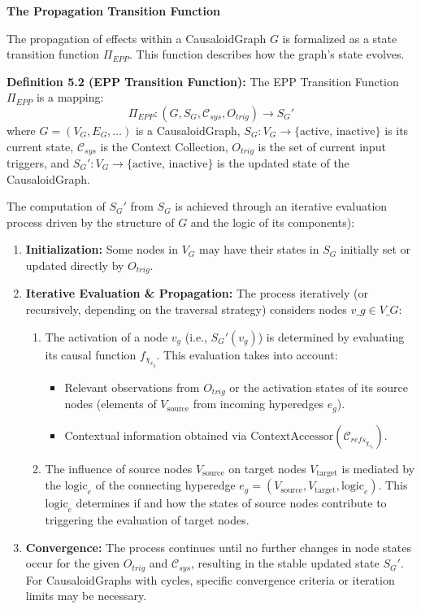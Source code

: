     
\textbf{The Propagation Transition Function}
    
    The propagation of effects within a CausaloidGraph \(G\) is formalized as a state transition function \(\Pi_{EPP}\). This function describes how the graph's state evolves.

    \textbf{Definition 5.2 (EPP Transition Function):} The EPP Transition Function \(\Pi_{EPP}\) is a mapping:
    \[ \Pi_{EPP} : (G, S_G, \mathcal{C}_{sys}, O_{trig}) \to S_G' \]
    where \(G=(V_G, E_G, \dots)\) is a CausaloidGraph, \(S_G: V_G \to \{\text{active, inactive}\}\) is its current state, \(\mathcal{C}_{sys}\) is the Context Collection, \(O_{trig}\) is the set of current input triggers, and \(S_G': V_G \to \{\text{active, inactive}\}\) is the updated state of the CausaloidGraph.

    The computation of \(S_G'\) from \(S_G\) is achieved through an iterative evaluation process driven by the structure of \(G\) and the logic of its components):
    \begin{enumerate}
        \item \textbf{Initialization:} Some nodes in \(V_G\) may have their states in \(S_G\) initially set or updated directly by \(O_{trig}\).
        \item \textbf{Iterative Evaluation \& Propagation:} The process iteratively (or recursively, depending on the traversal strategy) considers nodes \(v\_g \in V\_G\):
            \begin{enumerate}
                \item The activation of a node \(v_g\) (i.e., \(S_G'(v_g)\)) is determined by evaluating its causal function \(f_{\chi_{v_g}}\). This evaluation takes into account:
                    \begin{itemize}
                        \item Relevant observations from \(O_{trig}\) or the activation states of its source nodes (elements of \(V_{\text{source}}\) from incoming hyperedges \(e_g\)).
                        \item Contextual information obtained via \(\text{ContextAccessor}(\mathcal{C}_{refs_{\chi_{v_g}}})\).
                    \end{itemize}
                \item The influence of source nodes \(V_{\text{source}}\) on target nodes \(V_{\text{target}}\) is mediated by the \(\text{logic}_e\) of the connecting hyperedge \(e_g = (V_{\text{source}}, V_{\text{target}}, \text{logic}_e)\). This \(\text{logic}_e\) determines if and how the states of source nodes contribute to triggering the evaluation of target nodes.
            \end{enumerate}
        \item \textbf{Convergence:} The process continues until no further changes in node states occur for the given \(O_{trig}\) and \(\mathcal{C}_{sys}\), resulting in the stable updated state \(S_G'\). For CausaloidGraphs with cycles, specific convergence criteria or iteration limits may be necessary.
    \end{enumerate}
